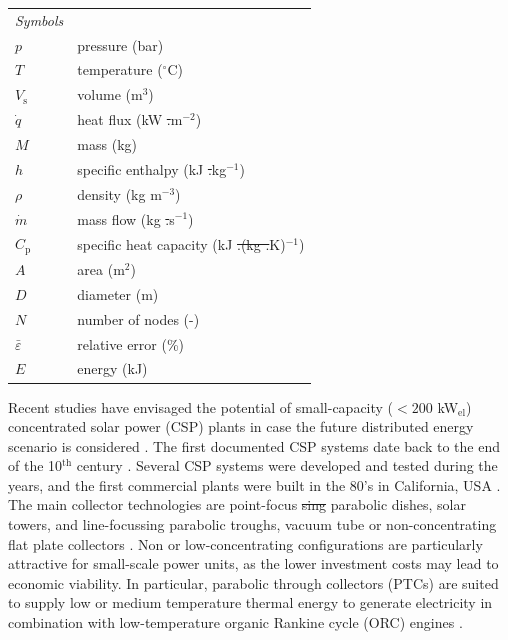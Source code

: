 \documentclass[final,3p,times,review]{elsarticle}
\providecommand{\DIFadd}[1]{{\protect\color{blue}\uwave{#1}}} %
\providecommand{\DIFdel}[1]{{\protect\color{red}\sout{#1}}}                      %
\providecommand{\DIFaddbegin}{} %
\providecommand{\DIFaddend}{} %
\providecommand{\DIFdelbegin}{} %
\providecommand{\DIFdelend}{} %
\providecommand{\DIFaddFL}[1]{\DIFadd{#1}} %
\providecommand{\DIFdelFL}[1]{\DIFdel{#1}} %
\providecommand{\DIFaddbeginFL}{} %
\providecommand{\DIFaddendFL}{} %
\providecommand{\DIFdelbeginFL}{} %
\providecommand{\DIFdelendFL}{} %
\begin{document}
\begin{table}[h!]
\begin{tabular}{lp{7.5cm}}
\textit{Symbols} \\
$p$ & pressure (bar)\\
$T$ & temperature ($^{\circ}$C)\\
$V_\mathrm{s}$ & volume (m$^3$)\\
$\dot{q}$& heat flux (kW \DIFdelbeginFL \DIFdelFL{.}\DIFdelendFL m$^{-2}$) \\
$M$ & mass (kg)\\
$h$ & specific enthalpy (kJ \DIFdelbeginFL \DIFdelFL{.}\DIFdelendFL kg$^{-1}$)\\
$\rho$ & density (kg m$^{-3}$)\\
$\dot{m}$& mass flow (kg \DIFdelbeginFL \DIFdelFL{.}\DIFdelendFL s$^{-1}$) \\
$ C_\mathrm{p} $& specific heat capacity (kJ \DIFdelbeginFL \DIFdelFL{.(kg .}\DIFdelendFL \DIFaddbeginFL \DIFaddFL{(kg }\DIFaddendFL K)$^{-1}$) \\
$A$ & area (m$^{2}$)\\
$D$ & diameter (m)\\
$N$ & number of nodes (-)\\
$\bar{\varepsilon}$ & relative error (\%)\\
$E$ & energy  (kJ)\\
\end{tabular}
\end{table}
%
Recent studies have envisaged the potential of small-capacity ($<200$ kW$_\mathrm{el}$) concentrated solar power (CSP) plants in case the future distributed energy scenario is considered \cite{Casati2012a,Prabhu2006}. The first documented CSP systems date back to the end of the 10$^\mathrm{th}$ century \cite{Butti_1980}. Several CSP systems were developed and tested during the years, and the first commercial plants were built in the 80's in California, USA \cite{IRENA_CSP_2013}.  The main collector technologies are point-focus \DIFdelbegin \DIFdel{sing }\DIFdelend \DIFaddbegin \DIFadd{single }\DIFaddend parabolic dishes, solar towers, and line-focussing parabolic troughs, vacuum tube or non-concentrating flat plate collectors \cite{Winter1991}. Non or low-concentrating configurations are particularly attractive for small-scale power units, as the lower investment costs may lead to economic viability. In particular,  parabolic through collectors (PTCs) are suited to supply low or medium temperature thermal energy to generate electricity in combination with low-temperature organic Rankine cycle (ORC) engines \cite{Verneau1978,Angelino1984Areview}.\\
\end{document}
